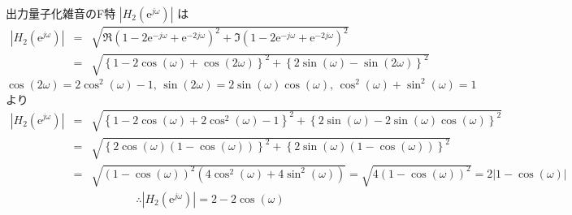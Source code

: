 \documentclass[a4j]{jarticle}
\begin{document}
出力量子化雑音のF特 \( |H_2(\mathrm{e}^{j\omega})| \) は
\begin{eqnarray*}
|H_2(\mathrm{e}^{j\omega})| &=& \sqrt{ \Re \left( 1 - 2\mathrm{e}^{-j\omega} + \mathrm{e}^{-2j\omega} \right)^2 + \Im \left( 1 - 2\mathrm{e}^{-j\omega} +\mathrm{e}^{-2j\omega} \right)^2 } \\
                            &=& \sqrt{ \left\{ 1-2\cos(\omega)+\cos(2\omega)\right\}^2 + \left\{ 2\sin(\omega) - \sin(2\omega) \right\}^2 }
\end{eqnarray*}
\( \cos(2\omega) = 2\cos^2(\omega)-1 ,\, \sin(2\omega) = 2\sin(\omega)\cos(\omega) ,\, \cos^2(\omega)+\sin^2(\omega) = 1 \) より
\begin{eqnarray*}
|H_2(\mathrm{e}^{j\omega})| &=& \sqrt{ \left\{ 1-2\cos(\omega)+2\cos^2(\omega)-1 \right\}^2 + \left\{ 2\sin(\omega) - 2\sin(\omega)\cos(\omega) \right\}^2 } \\
                            &=& \sqrt{ \left\{ 2\cos(\omega)(1-\cos(\omega))\right\}^2 + \left\{ 2\sin(\omega)(1-\cos(\omega)) \right\}^2 } \\
                            &=& \sqrt{ (1-\cos(\omega))^2(4\cos^2(\omega) + 4\sin^2(\omega)) } = \sqrt{ 4(1-\cos(\omega))^2 } = 2|1-\cos(\omega)|
\end{eqnarray*}
\begin{eqnarray}
\therefore |H_2(\mathrm{e}^{j\omega})| = 2-2\cos(\omega)
\end{eqnarray}
\end{document}
